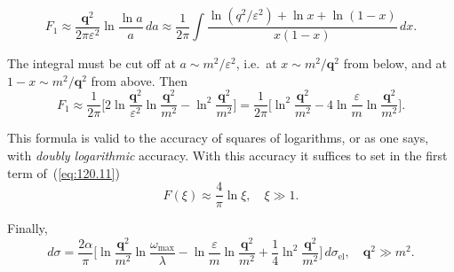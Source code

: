 \[
F_1 \approx \frac{\mathbf{q}^2}{2\pi\varepsilon^2}\ln\frac{\ln a}{a}\,da \approx \frac{1}{2\pi}\int \frac{\ln(q^2/\varepsilon^2) + \ln x + \ln(1-x)}{x(1-x)}\,dx.
\]


The integral must be cut off at $a \sim m^2/\varepsilon^2$, i.e.\ at $x \sim m^2/\mathbf{q}^2$ from below, and at $1 - x \sim m^2/\mathbf{q}^2$ from above. Then
\[
F_1 \approx \frac{1}{2\pi}\biggl[2\ln\frac{\mathbf{q}^2}{\varepsilon^2}\ln\frac{\mathbf{q}^2}{m^2} - \ln^2\frac{\mathbf{q}^2}{m^2}\biggr] = \frac{1}{2\pi}\biggl[\ln^2\frac{\mathbf{q}^2}{m^2} - 4\ln\frac{\varepsilon}{m}\ln\frac{\mathbf{q}^2}{m^2}\biggr].
\]

This formula is valid to the accuracy of squares of logarithms, or as one says, with \emph{doubly logarithmic} accuracy. With this accuracy it suffices to set in the first term of~(\ref{eq:120.11})
\[
F(\xi) \approx \frac{4}{\pi}\ln\xi, \quad \xi \gg 1.
\]

Finally,
\begin{equation}
d\sigma = \frac{2\alpha}{\pi}\biggl[\ln\frac{\mathbf{q}^2}{m^2}\ln\frac{\omega_{\max}}{\lambda} - \ln\frac{\varepsilon}{m}\ln\frac{\mathbf{q}^2}{m^2} + \frac{1}{4}\ln^2\frac{\mathbf{q}^2}{m^2}\biggr]\,d\sigma_{\text{el}}, \quad \mathbf{q}^2 \gg m^2.
\label{eq:120.14}
\end{equation}
